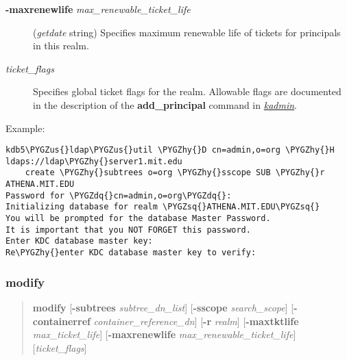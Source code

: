 \documentclass[letterpaper,10pt,english]{sphinxmanual}
\def\PYGZus{\char`\_}
\def\PYGZhy{\char`\-}
\def\PYGZsq{\char`\'}
\def\PYGZdq{\char`\"}
\begin{document}
\begin{description}
\item[{\textbf{-maxrenewlife} \emph{max\_renewable\_ticket\_life}}] \leavevmode
(\emph{getdate} string) Specifies maximum renewable life of
tickets for principals in this realm.

\item[{\emph{ticket\_flags}}] \leavevmode
Specifies global ticket flags for the realm.  Allowable flags are
documented in the description of the \textbf{add\_principal} command in
{\hyperref[admin/admin_commands/kadmin_local:kadmin-1]{\emph{kadmin}}}.

\end{description}

Example:

\begin{Verbatim}[commandchars=\\\{\}]
kdb5\PYGZus{}ldap\PYGZus{}util \PYGZhy{}D cn=admin,o=org \PYGZhy{}H ldaps://ldap\PYGZhy{}server1.mit.edu
    create \PYGZhy{}subtrees o=org \PYGZhy{}sscope SUB \PYGZhy{}r ATHENA.MIT.EDU
Password for \PYGZdq{}cn=admin,o=org\PYGZdq{}:
Initializing database for realm \PYGZsq{}ATHENA.MIT.EDU\PYGZsq{}
You will be prompted for the database Master Password.
It is important that you NOT FORGET this password.
Enter KDC database master key:
Re\PYGZhy{}enter KDC database master key to verify:
\end{Verbatim}


\subsubsection{modify}
\label{admin/admin_commands/kdb5_ldap_util:kdb5-ldap-util-create-end}\label{admin/admin_commands/kdb5_ldap_util:modify}\label{admin/admin_commands/kdb5_ldap_util:kdb5-ldap-util-modify}\begin{quote}

\textbf{modify}
{[}\textbf{-subtrees} \emph{subtree\_dn\_list}{]}
{[}\textbf{-sscope} \emph{search\_scope}{]}
{[}\textbf{-containerref} \emph{container\_reference\_dn}{]}
{[}\textbf{-r} \emph{realm}{]}
{[}\textbf{-maxtktlife} \emph{max\_ticket\_life}{]}
{[}\textbf{-maxrenewlife} \emph{max\_renewable\_ticket\_life}{]}
{[}\emph{ticket\_flags}{]}
\end{quote}
\end{document}
